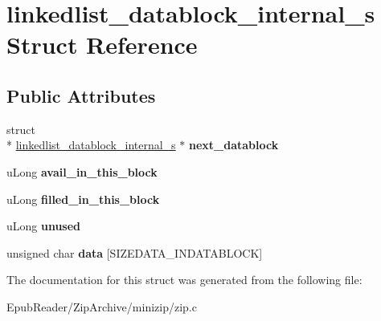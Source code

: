 \hypertarget{structlinkedlist__datablock__internal__s}{\section{linkedlist\-\_\-datablock\-\_\-internal\-\_\-s Struct Reference}
\label{structlinkedlist__datablock__internal__s}
}
\subsection*{Public Attributes}
\begin{DoxyCompactItemize}
\item 
\hypertarget{structlinkedlist__datablock__internal__s_a1f5abadbf41d82b8724a048a33c4c153}{struct \\*
\hyperlink{structlinkedlist__datablock__internal__s}{linkedlist\-\_\-datablock\-\_\-internal\-\_\-s} $\ast$ {\bfseries next\-\_\-datablock}}\label{structlinkedlist__datablock__internal__s_a1f5abadbf41d82b8724a048a33c4c153}

\item 
\hypertarget{structlinkedlist__datablock__internal__s_a1d63f75d88f05ee665221ccf618a57ed}{u\-Long {\bfseries avail\-\_\-in\-\_\-this\-\_\-block}}\label{structlinkedlist__datablock__internal__s_a1d63f75d88f05ee665221ccf618a57ed}

\item 
\hypertarget{structlinkedlist__datablock__internal__s_a76ae854b6029e6617c7544d2eb311f77}{u\-Long {\bfseries filled\-\_\-in\-\_\-this\-\_\-block}}\label{structlinkedlist__datablock__internal__s_a76ae854b6029e6617c7544d2eb311f77}

\item 
\hypertarget{structlinkedlist__datablock__internal__s_ae7275ad9d24cbe4f4c062f29abfb3b91}{u\-Long {\bfseries unused}}\label{structlinkedlist__datablock__internal__s_ae7275ad9d24cbe4f4c062f29abfb3b91}

\item 
\hypertarget{structlinkedlist__datablock__internal__s_a04900ee41fa2247a73b7570ec162bb1d}{unsigned char {\bfseries data} \mbox{[}S\-I\-Z\-E\-D\-A\-T\-A\-\_\-\-I\-N\-D\-A\-T\-A\-B\-L\-O\-C\-K\mbox{]}}\label{structlinkedlist__datablock__internal__s_a04900ee41fa2247a73b7570ec162bb1d}

\end{DoxyCompactItemize}


The documentation for this struct was generated from the following file\-:\begin{DoxyCompactItemize}
\item 
Epub\-Reader/\-Zip\-Archive/minizip/zip.\-c\end{DoxyCompactItemize}

